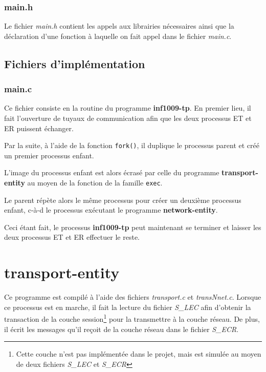 \documentclass[11pt,french]{article}
\begin{document}
            \subsubsection{main.h} %
            \label{ssub:main.h}
                Le fichier \emph{main.h} contient les appels aux librairies nécessaires ainsi que la déclaration
                d'une fonction à laquelle on fait appel dans le fichier \emph{main.c}.
                
        \subsection{Fichiers d'implémentation} %
        \label{sub:fich-compiles-inf1009-tp}
        
        \subsubsection{main.c} %
        \label{ssub:main.c}
            Ce fichier consiste en la routine du programme {\bf inf1009-tp}. En premier lieu, il fait l'ouverture de tuyaux de communication
            afin que les deux processus ET et ER puissent échanger.
            

            Par la suite, à l'aide de la fonction \texttt{fork()}, il duplique le processus parent et créé un premier processus enfant.
            

            L'image du processus enfant est alors écrasé par celle du programme {\bf transport-entity} au moyen de la fonction de la famille
            \texttt{exec}.
            
            
            Le parent répète alors le même processus pour créer un deuxième processus enfant, c-à-d le processus exécutant le programme
            {\bf network-entity}.
            

            Ceci étant fait, le processus {\bf inf1009-tp} peut maintenant se terminer et laisser les deux processus ET et ER effectuer le reste.

    \section{transport-entity} %
    \label{sec:transport-entity}
        Ce programme est compilé à l'aide des fichiers \emph{transport.c} et \emph{transNnet.c}. Lorsque ce processus est en marche, il fait la lecture
        du fichier \emph{S\_LEC} afin d'obtenir la transaction de la couche session\footnote{Cette couche n'est pas implémentée dans le projet, mais est
        simulée au moyen de deux fichiers \emph{S\_LEC} et \emph{S\_ECR}} pour la transmettre à la couche réseau. De plus,
	il écrit les messages qu'il reçoit de la couche réseau dans le fichier \emph{S\_ECR}.
	
\end{document}
